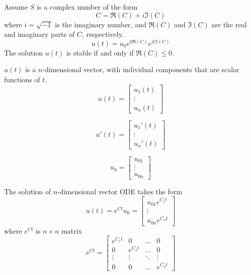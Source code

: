 \documentclass{blog}
\begin{document}
\begin{example}
    Assume $S$ is a complex number of the form
    \begin{equation}
        C = \mathfrak{R}(C) + i \mathfrak{I}(C)
    \end{equation}
    where $i = \sqrt{-1}$ is the imaginary number, and
    $\mathfrak{R}(C)$ and $\mathfrak{I}(C)$ are the real and imaginary parts of $C$, respectively.
    \begin{equation}
        u(t) = u_{0} e^{t \mathfrak{R}(C)} e^{i t \mathfrak{I}(C)}
    \end{equation}
    The solution $u(t)$ is stable if and only if $\mathfrak{R}(C) \leq 0$.
\end{example}

\begin{definition}
    $u(t)$ is a $n$-dimensional vector, with individual components that are scalar functions of $t$.
    \begin{equation}
        u(t) = \begin{bmatrix}u_{1}(t) \\ \vdots \\ u_{n}(t) \end{bmatrix}
    \end{equation}

    \begin{equation}
        u'(t) = \begin{bmatrix}u_{1}'(t) \\ \vdots \\ u_{n}'(t) \end{bmatrix}
    \end{equation}

    \begin{equation}
        u_{0} = \begin{bmatrix}u_{01} \\ \vdots \\ u_{0n} \end{bmatrix}
    \end{equation}
\end{definition}

The solution of $n$-dimensional vector ODE takes the form
\begin{equation}
    u(t) = e^{Ct} u_{0}
    = \begin{bmatrix}u_{01}e^{C_{1}t} \\ \vdots \\ u_{0n}e^{C_{n}t} \end{bmatrix}
\end{equation}
where $e^{Ct}$ is $n \times n$ matrix
\begin{equation}
    e^{Ct} =
    \begin{bmatrix}
        e^{C_{1}t} & 0          & \dots  & 0          \\
        0          & e^{C_{2}t} & \dots  & 0          \\
        \vdots     & \vdots     & \ddots & \vdots     \\
        0          & 0          & \dots  & e^{C_{n}t}
    \end{bmatrix}
\end{equation}
\end{document}
